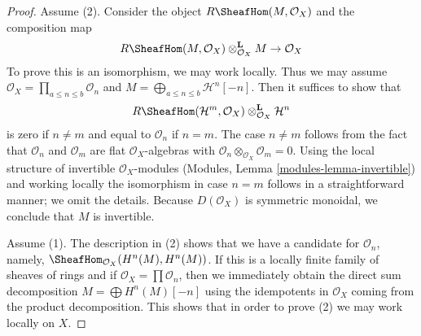 \begin{proof}
Assume (2). Consider the object $R\SheafHom(M, \mathcal{O}_X)$
and the composition map
$$
R\SheafHom(M, \mathcal{O}_X) \otimes_{\mathcal{O}_X}^\mathbf{L} M \to
\mathcal{O}_X
$$
To prove this is an isomorphism, we may work locally. Thus we may
assume $\mathcal{O}_X = \prod_{a \leq n \leq b} \mathcal{O}_n$
and $M = \bigoplus_{a \leq n \leq b} \mathcal{H}^n[-n]$.
Then it suffices to show that
$$
R\SheafHom(\mathcal{H}^m, \mathcal{O}_X)
\otimes_{\mathcal{O}_X}^\mathbf{L} \mathcal{H}^n
$$
is zero if $n \not = m$ and equal to $\mathcal{O}_n$ if $n = m$.
The case $n \not = m$ follows from the fact that $\mathcal{O}_n$ and
$\mathcal{O}_m$ are flat $\mathcal{O}_X$-algebras with
$\mathcal{O}_n \otimes_{\mathcal{O}_X} \mathcal{O}_m = 0$.
Using the local structure of invertible $\mathcal{O}_X$-modules
(Modules, Lemma \ref{modules-lemma-invertible}) and working locally
the isomorphism in case $n = m$ follows in a straightforward manner;
we omit the details. Because $D(\mathcal{O}_X)$ is symmetric monoidal,
we conclude that $M$ is invertible.

\medskip\noindent
Assume (1). The description in (2) shows that we have a candidate
for $\mathcal{O}_n$, namely,
$\SheafHom_{\mathcal{O}_X}(H^n(M), H^n(M))$.
If this is a locally finite family of sheaves of rings
and if $\mathcal{O}_X = \prod \mathcal{O}_n$, then we immediately
obtain the direct sum decomposition $M = \bigoplus H^n(M)[-n]$
using the idempotents in $\mathcal{O}_X$ coming from the product
decomposition.
This shows that in order to prove (2) we may work locally on $X$.


\end{proof}
